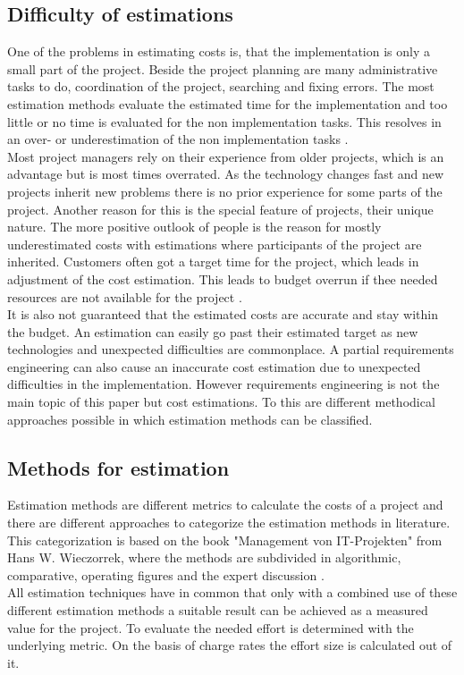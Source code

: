 \subsection{Difficulty of estimations}

One of the problems in estimating costs is, that the implementation is only a small part of the project. Beside the project planning are many administrative tasks to do, coordination of the project, searching and fixing errors. The most estimation methods evaluate the estimated time for the implementation and too little or no time is evaluated for the non implementation tasks. This resolves in an over- or underestimation of the non implementation tasks \cite{itplanung}.\\
Most project managers rely on their experience from older projects, which is an advantage but is most times overrated. As the technology changes fast and new projects inherit new problems there is no prior experience for some parts of the project. Another reason for this is the special feature of projects, their unique nature. The more positive outlook of people is the reason for mostly underestimated costs with estimations where participants of the project are inherited. Customers often got a target time for the project, which leads in adjustment of the cost estimation. This leads to budget overrun if thee needed resources are not available for the project \cite{winfwiki}.\\
It is also not guaranteed that the estimated costs are accurate and stay within the budget. An estimation can easily go past their estimated target as new technologies and unexpected difficulties are commonplace. A partial requirements engineering can also cause an inaccurate cost estimation due to unexpected difficulties in the implementation. However requirements engineering is not the main topic of this paper but cost estimations. To this are different methodical approaches possible in which estimation methods can be classified.\\

\subsection{Methods for estimation}\label{chapter:estimationmethods}

Estimation methods are different metrics to calculate the costs of a project and there are different approaches to categorize the estimation methods in literature. This categorization is based on the book "Management von IT-Projekten" from Hans W. Wieczorrek, where the methods are subdivided in algorithmic, comparative, operating figures and the expert discussion \cite{itplanung}.\\
All estimation techniques have in common that only with a combined use of these different estimation methods a suitable result can be achieved as a measured value for the project. To evaluate the needed effort is determined with the underlying metric. On the basis of charge rates the effort size is calculated out of it.\\

